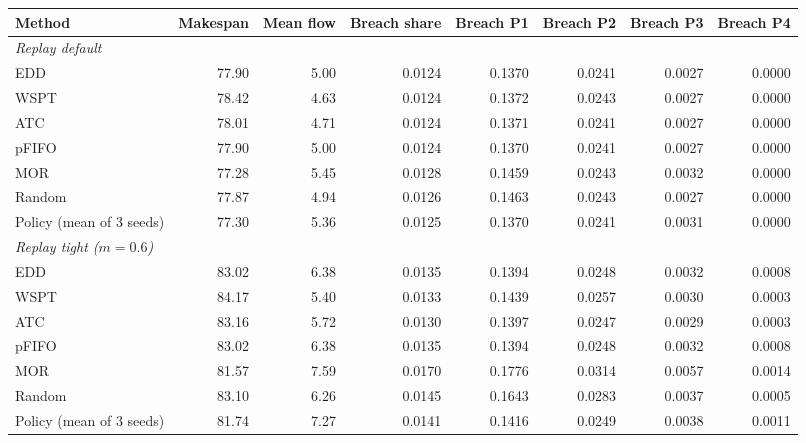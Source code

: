\begin{tabular}{lrrrrrrr}
\toprule
Method & Makespan & Mean flow & Breach share & Breach P1 & Breach P2 & Breach P3 & Breach P4 \\
\midrule
\multicolumn{8}{l}{\textit{Replay default}} \\
\midrule
EDD & 77.90 & 5.00 & 0.0124 & 0.1370 & 0.0241 & 0.0027 & 0.0000 \\
WSPT & 78.42 & 4.63 & 0.0124 & 0.1372 & 0.0243 & 0.0027 & 0.0000 \\
ATC & 78.01 & 4.71 & 0.0124 & 0.1371 & 0.0241 & 0.0027 & 0.0000 \\
pFIFO & 77.90 & 5.00 & 0.0124 & 0.1370 & 0.0241 & 0.0027 & 0.0000 \\
MOR & 77.28 & 5.45 & 0.0128 & 0.1459 & 0.0243 & 0.0032 & 0.0000 \\
Random & 77.87 & 4.94 & 0.0126 & 0.1463 & 0.0243 & 0.0027 & 0.0000 \\
Policy (mean of 3 seeds) & 77.30 & 5.36 & 0.0125 & 0.1370 & 0.0241 & 0.0031 & 0.0000 \\
\midrule
\multicolumn{8}{l}{\textit{Replay tight ($m{=}0.6$)}} \\
\midrule
EDD & 83.02 & 6.38 & 0.0135 & 0.1394 & 0.0248 & 0.0032 & 0.0008 \\
WSPT & 84.17 & 5.40 & 0.0133 & 0.1439 & 0.0257 & 0.0030 & 0.0003 \\
ATC & 83.16 & 5.72 & 0.0130 & 0.1397 & 0.0247 & 0.0029 & 0.0003 \\
pFIFO & 83.02 & 6.38 & 0.0135 & 0.1394 & 0.0248 & 0.0032 & 0.0008 \\
MOR & 81.57 & 7.59 & 0.0170 & 0.1776 & 0.0314 & 0.0057 & 0.0014 \\
Random & 83.10 & 6.26 & 0.0145 & 0.1643 & 0.0283 & 0.0037 & 0.0005 \\
Policy (mean of 3 seeds) & 81.74 & 7.27 & 0.0141 & 0.1416 & 0.0249 & 0.0038 & 0.0011 \\
\bottomrule
\end{tabular}
